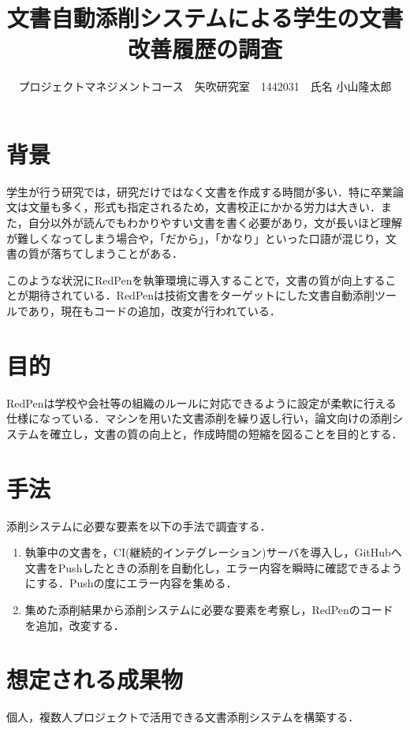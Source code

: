 \documentclass[uplatex,twocolumn,dvipdfmx]{jsarticle}
\title{\vspace{-5mm}\fontsize{14pt}{0pt}\selectfont 文書自動添削システムによる学生の文書改善履歴の調査}
\author{\normalsize プロジェクトマネジメントコース　矢吹研究室　1442031　氏名 小山隆太郎}
\date{}
\begin{document}
\fontsize{10.5pt}{\baselineskip}\selectfont
\maketitle





\section{背景}
学生が行う研究では，研究だけではなく文書を作成する時間が多い．特に卒業論文は文量も多く，形式も指定されるため，文書校正にかかる労力は大きい．また，自分以外が読んでもわかりやすい文書を書く必要があり，文が長いほど理解が難しくなってしまう場合や，「だから」，「かなり」といった口語が混じり，文書の質が落ちてしまうことがある．

このような状況にRedPen\cite{a}を執筆環境に導入することで，文書の質が向上することが期待されている．RedPenは技術文書をターゲットにした文書自動添削ツールであり，現在もコードの追加，改変が行われている\cite{b}．

\section{目的}
RedPenは学校や会社等の組織のルールに対応できるように設定が柔軟に行える仕様になっている．マシンを用いた文書添削を繰り返し行い，論文向けの添削システムを確立し，文書の質の向上と，作成時間の短縮を図ることを目的とする．

\section{手法}
添削システムに必要な要素を以下の手法で調査する．

\begin{enumerate}
 \item 執筆中の文書を，CI(継続的インテグレーション)サーバを導入し，GitHubへ文書をPushしたときの添削を自動化し，エラー内容を瞬時に確認できるようにする．Pushの度にエラー内容を集める\cite{c}．
 \item 集めた添削結果から添削システムに必要な要素を考察し，RedPenのコードを追加，改変する．
\end{enumerate}

\section{想定される成果物}
個人，複数人プロジェクトで活用できる文書添削システムを構築する．
\end{document}
